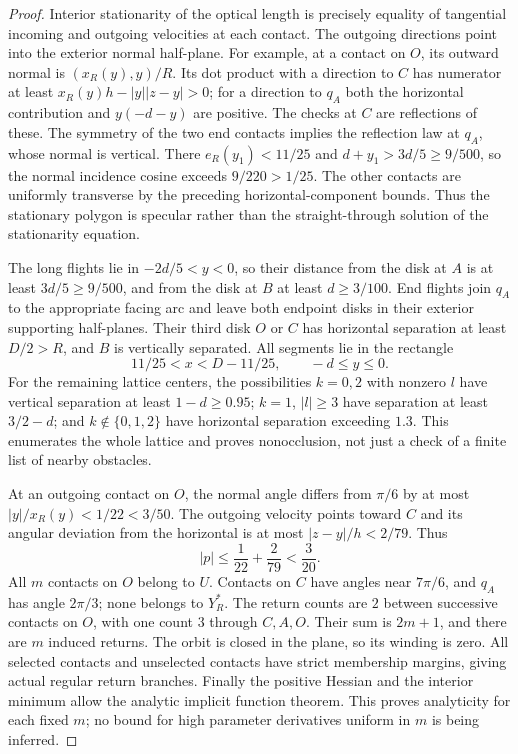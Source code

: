 \begin{proof}
Interior stationarity of the optical length is precisely equality
of tangential incoming and outgoing velocities at each contact.
The outgoing directions point into the exterior normal half-plane.
For example, at a contact on $O$, its outward normal is
$(x_R(y),y)/R$. Its dot product with a direction to $C$ has numerator
at least $x_R(y)h-|y||z-y|>0$; for a direction to $q_A$ both the
horizontal contribution and $y(-d-y)$ are positive. The checks at
$C$ are reflections of these. The symmetry of the two end contacts
implies the reflection law at $q_A$, whose normal is vertical. There
$e_R(y_1)<11/25$ and $d+y_1>3d/5\ge9/500$, so the normal
incidence cosine exceeds $9/220>1/25$. The other contacts are
uniformly transverse by the preceding horizontal-component bounds. Thus the stationary polygon
is specular rather than the straight-through solution of the
stationarity equation.

The long flights lie in $-2d/5<y<0$, so their distance from the disk
at $A$ is at least $3d/5\ge9/500$, and from the disk at $B$ at
least $d\ge3/100$. End flights join $q_A$ to the appropriate facing
arc and leave both endpoint disks in their exterior supporting
half-planes. Their third disk $O$ or $C$ has horizontal separation
at least $D/2>R$, and $B$ is vertically separated. All segments
lie in the rectangle
\[
       11/25<x<D-11/25,\qquad -d\le y\le0.
\]
For the remaining lattice centers, the possibilities $k=0,2$ with
nonzero $l$ have vertical separation at least $1-d\ge0.95$;
$k=1$, $|l|\ge3$ have separation at least $3/2-d$; and
$k\notin\{0,1,2\}$ have horizontal separation exceeding $1.3$.
This enumerates the whole lattice and proves nonocclusion, not just
a check of a finite list of nearby obstacles.

At an outgoing contact on $O$, the normal angle differs from
$\pi/6$ by at most $|y|/x_R(y)<1/22<3/50$. The outgoing velocity
points toward $C$ and its angular deviation from the horizontal is
at most $|z-y|/h<2/79$. Thus
\[
 |p|\le \frac1{22}+\frac2{79}<\frac3{20}.
\]
All $m$ contacts on $O$ belong to $U$. Contacts on $C$ have angles
near $7\pi/6$, and $q_A$ has angle $2\pi/3$; none belongs to
$Y_R^*$. The return counts are $2$ between successive contacts on
$O$, with one count $3$ through $C,A,O$. Their sum is $2m+1$,
and there are $m$ induced returns. The orbit is closed in the plane,
so its winding is zero. All selected contacts and unselected contacts
have strict membership margins, giving actual regular return branches.
Finally the positive Hessian and the interior minimum allow the
analytic implicit function theorem. This proves analyticity for each
fixed $m$; no bound for high parameter derivatives uniform in $m$ is
being inferred.
\end{proof}

